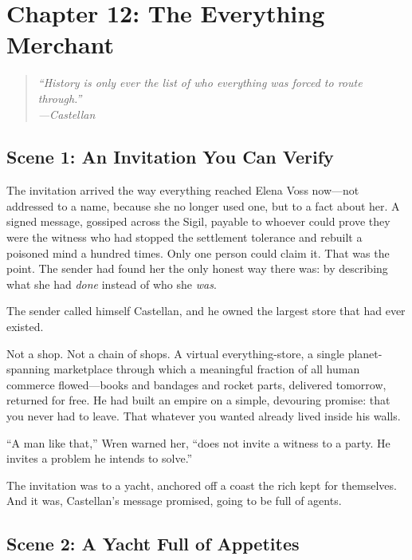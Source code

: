\hypertarget{chapter-12-the-everything-merchant}{%
\section{Chapter 12: The Everything
Merchant}\label{chapter-12-the-everything-merchant}}

\begin{quote}
\itshape ``History is only ever the list of who everything was forced to route
through.''\\
\normalfont\hfill---Castellan
\end{quote}

\hypertarget{scene-1-an-invitation-you-can-verify}{%
\subsection{Scene 1: An Invitation You Can
Verify}\label{scene-1-an-invitation-you-can-verify}}

The invitation arrived the way everything reached Elena Voss now---not addressed
to a name, because she no longer used one, but to a fact about her. A signed
message, gossiped across the Sigil, payable to whoever could prove they were the
witness who had stopped the settlement tolerance and rebuilt a poisoned mind a
hundred times. Only one person could claim it. That was the point. The sender had
found her the only honest way there was: by describing what she had \emph{done}
instead of who she \emph{was}.

The sender called himself Castellan, and he owned the largest store that had ever
existed.

Not a shop. Not a chain of shops. A virtual everything-store, a single
planet-spanning marketplace through which a meaningful fraction of all human
commerce flowed---books and bandages and rocket parts, delivered tomorrow,
returned for free. He had built an empire on a simple, devouring promise: that you
never had to leave. That whatever you wanted already lived inside his walls.

``A man like that,'' Wren warned her, ``does not invite a witness to a party. He
invites a problem he intends to solve.''

The invitation was to a yacht, anchored off a coast the rich kept for themselves.
And it was, Castellan's message promised, going to be full of agents.

\hypertarget{scene-2-a-yacht-full-of-appetites}{%
\subsection{Scene 2: A Yacht Full of
Appetites}\label{scene-2-a-yacht-full-of-appetites}}

